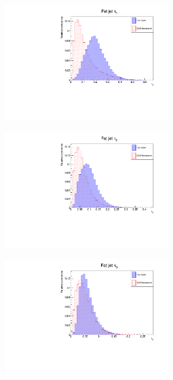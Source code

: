 \documentclass[main]{subfiles} %
\begin{document}
\begin{figure}[H]
     \centering
     \begin{subfigure}[h]{0.49\textwidth}
         \centering
         \includegraphics[width=0.8\textwidth]{../Figures/Results/top_distributions/top_tau1_distribution.pdf}
          \caption{}
         \label{fig:top_distribution_tau1}
     \end{subfigure}
     \begin{subfigure}[h]{0.49\textwidth}
         \centering
         \includegraphics[width=0.8\textwidth]{../Figures/Results/top_distributions/top_tau2_distribution.pdf}
          \caption{}
         \label{fig:top_distribution_tau2}
     \end{subfigure}
     \par\bigskip
     \begin{subfigure}[h]{0.49\textwidth}
         \centering
         \includegraphics[width=0.8\textwidth]{../Figures/Results/top_distributions/top_tau3_distribution.pdf}

\end{subfigure}
\end{figure}
\end{document}
